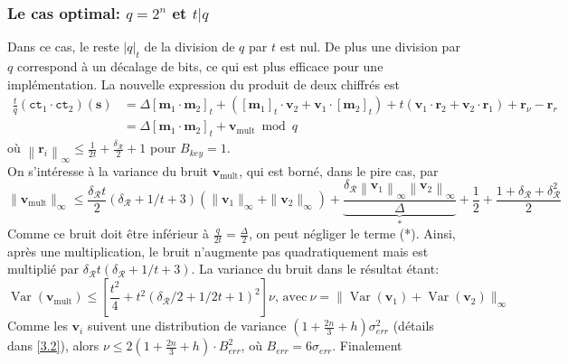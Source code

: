 \documentclass[11pt, headsepline, a4paper, fleqn, oneside]{article}
\begin{document}
\subsubsection{Le cas optimal: $q=2^n$ et $t | q$}
Dans ce cas, le reste $|q|_t$ de la division de $q$ par $t$ est nul. De plus une division par $q$ correspond à un décalage de bits, ce qui est plus efficace pour une implémentation. La nouvelle expression du produit de deux chiffrés est
$$\begin{aligned}\frac{t}{q}\left(\texttt{ct}_{1} \cdot \texttt{ct}_{2}\right)(\boldsymbol{s}) &= \Delta\left[\boldsymbol{m}_{1} \cdot \boldsymbol{m}_{2}\right]_{t}+\left(\left[\boldsymbol{m}_{1}\right]_{t} \cdot \boldsymbol{v}_{2}+\boldsymbol{v}_{1} \cdot\left[\boldsymbol{m}_{2}\right]_{t}\right)+t\left(\boldsymbol{v}_{1} \cdot \boldsymbol{r}_{2}+\boldsymbol{v}_{2} \cdot \boldsymbol{r}_{1}\right)+ \boldsymbol{r}_\nu - \boldsymbol{r}_r
\\&=\Delta\left[\boldsymbol{m}_{1} \cdot \boldsymbol{m}_{2}\right]_{t} + \boldsymbol{v}_\mathrm{mult} \bmod{q}
\end{aligned}$$
où $\left\|\boldsymbol{r}_i\right\|_{\infty} \leq \frac{1}{2t}+ \frac{\delta_\mathcal{R}}{2} + 1$ pour $B_{key} = 1$.\\
On s'intéresse à la variance du bruit $\boldsymbol{v}_\mathrm{mult}$, qui est borné, dans le pire cas, par $$\|\boldsymbol{v}_\mathrm{mult}\|_\infty \leq \frac{\delta_{\mathcal{R}} t}{2}(\delta_{\mathcal{R}} + 1/t + 3) (\|\boldsymbol{v}_1\|_\infty + \|\boldsymbol{v}_2\|_\infty) + \underbrace{ \frac{\delta_{\mathcal{R}}\left\|\boldsymbol{v}_{1}\right\|_{\infty}\left\|\boldsymbol{v}_{2}\right\|_{\infty}}{\Delta}}_\text{$*$}+\frac{1}{2} +  \frac{1+\delta_{\mathcal{R}}+\delta_{\mathcal{R}}^2}{2}$$
Comme ce bruit doit être inférieur à $\frac{q}{2t} = \frac{\Delta}{2}$, on peut négliger le terme (*). Ainsi, après une multiplication, le bruit n'augmente pas quadratiquement mais est multiplié par  $\delta_{\mathcal{R}} t(\delta_{\mathcal{R}} + 1/t + 3)$. La variance du bruit dans le résultat étant: 
\begin{equation*}
    \operatorname{Var}(\boldsymbol{v}_\mathrm{mult}) \leq \left[\frac{t^2}{4}+t^2 \left(\delta_{\mathcal{R}}/2 + 1/2t + 1\right)^2\right] \nu ,\, \textrm{avec} \ \nu = \|\operatorname{Var}(\boldsymbol{v}_1) + \operatorname{Var}(\boldsymbol{v}_2)\|_\infty
\end{equation*}
Comme les $\boldsymbol{v}_i$ suivent une distribution de variance $(1+\frac{2n}{3}+h)\sigma_{err} ^2$ (détails dans \ref{3.2}), alors $\nu \leq 2(1+\frac{2n}{3}+h) \cdot B_{err} ^2$, où $B_{err} = 6\sigma_{err}$. Finalement 
\end{document}
